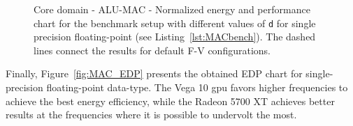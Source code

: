 \begin{figure}[!htb]
    \centering
    \begin{subfigmatrix}{2}
      \label{fig:MAC_behaviour}
    \end{subfigmatrix}
    \caption{Core domain - ALU-MAC - Normalized energy and performance chart for the benchmark setup with different values of \texttt{d} for single precision floating-point (see Listing~\ref{lst:MACbench}). The dashed lines connect the results for default F-V configurations.}
\end{figure}

Finally, Figure~\ref{fig:MAC_EDP} presents the obtained EDP chart for single-precision floating-point data-type. The Vega 10 \acrshort{gpu} favors higher frequencies to achieve the best energy efficiency, while the Radeon 5700 XT achieves better results at the frequencies where it is possible to undervolt the most.


